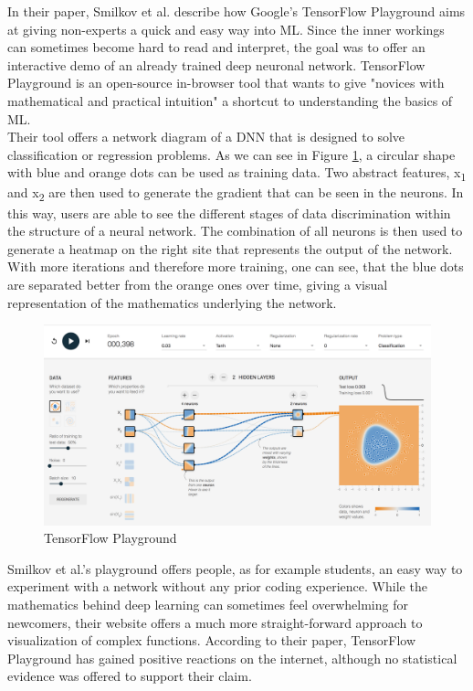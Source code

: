 \documentclass{acmsiggraph}               %
\begin{document}
In their paper, Smilkov et al. describe how Google's TensorFlow Playground aims at giving non-experts a quick and easy way into ML. Since the inner workings can sometimes become hard to read and interpret, the goal was to offer an interactive demo of an already trained deep neuronal network. TensorFlow Playground is an open-source in-browser tool that wants to give "novices with mathematical and practical intuition" \cite[p.~1]{Smilkov2017} a shortcut to understanding the basics of ML.\\
Their tool offers a network diagram of a DNN that is designed to solve classification or regression problems. As we can see in Figure \ref{fig:tensorflow_playground}, a circular shape with blue and orange dots can be used as training data. Two abstract features, x\textsubscript{1} and x\textsubscript{2} are then used to generate the gradient that can be seen in the neurons. In this way, users are able to see the different stages of data discrimination within the structure of a neural network. The combination of all neurons is then used to generate a heatmap on the right site that represents the output of the network. With more iterations and therefore more training, one can see, that the blue dots are separated better from the orange ones over time, giving a visual representation of the mathematics underlying the network.

\begin{figure}
\includegraphics[width=\textwidth]{tensorflow_playground_smilkov_et_al}
\caption{TensorFlow Playground \protect\cite{Smilkov2017}}
\label{fig:tensorflow_playground}
\centering
\end{figure}

Smilkov et al.'s playground offers people, as for example students, an easy way to experiment with a network without any prior coding experience. While the mathematics behind deep learning can sometimes feel overwhelming for newcomers, their website offers a much more straight-forward approach to visualization of complex functions. According to their paper, TensorFlow Playground has gained positive reactions on the internet, although no statistical evidence was offered to support their claim.
\end{document}

